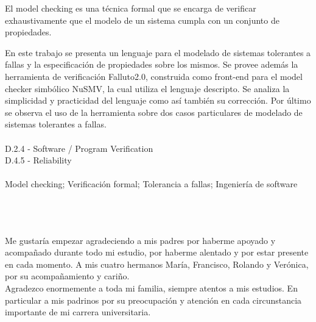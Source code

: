 \documentclass[pdftex,a4paper,12pt]{book}
\begin{document}

El model checking es una t\'ecnica formal que se encarga de verificar exhaustivamente que el modelo de un sistema cumpla con un conjunto de propiedades.

En este trabajo se presenta un lenguaje para el modelado de sistemas tolerantes a fallas y la especificaci\'on de propiedades sobre los mismos. Se provee adem\'as la herramienta de verificaci\'on Falluto2.0, construida como front-end para el model checker simb\'olico NuSMV, la cual utiliza el lenguaje descripto. Se analiza la simplicidad y practicidad del lenguaje como as\'i tambi\'en su correcci\'on. Por \'ultimo se observa el uso de la herramienta sobre dos casos particulares de modelado de sistemas tolerantes a fallas.\\

\\
\indent D.2.4 - Software / Program Verification\\
\indent D.4.5 - Reliability\\

\\
\indent Model checking; Verificaci\'on formal; Tolerancia a fallas; Ingenier\'ia de software

\newpage
~\\
\newpage
\chapter*{}

Me gustar\'ia empezar agradeciendo a mis padres por haberme apoyado y acompa\~nado durante todo mi estudio, por haberme alentado y por estar presente en cada momento. A mis cuatro hermanos Mar\'ia, Francisco, Rolando y Ver\'onica, por su acompa\~namiento y cari\~no.\\

Agradezco enormemente a toda mi familia, siempre atentos a mis estudios. En particular a mis padrinos por su preocupaci\'on y atenci\'on en cada circunstancia importante de mi carrera universitaria.\\
\end{document}
